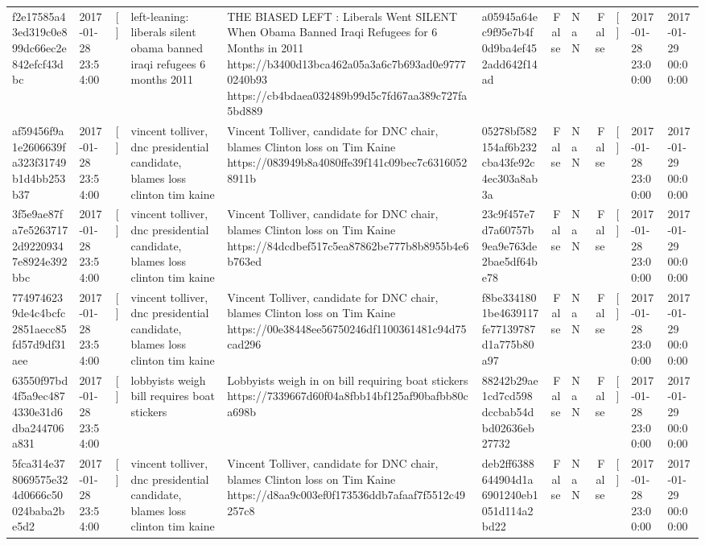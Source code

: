 \begin{tabular}{llllllrlrlll}
f2e17585a43ed319c0e899dc66ec2e842efcf43dbc & 2017-01-28 23:54:00 & [] & left-leaning: liberals silent obama banned iraqi refugees 6 months 2011 & THE BIASED LEFT : Liberals Went SILENT When Obama Banned Iraqi Refugees for 6 Months in 2011 https://b3400d13bca462a05a3a6c7b693ad0e97770240b93 https://cb4bdaea032489b99d5c7fd67aa389c727fa5bd889 & a05945a64ec9f95e7b4f0d9ba4ef452add642f14ad & False & NaN & False & [] & 2017-01-28 23:00:00 & 2017-01-29 00:00:00 \\
af59456f9a1e2606639fa323f31749b1d4bb253b37 & 2017-01-28 23:54:00 & [] & vincent tolliver, dnc presidential candidate, blames loss clinton tim kaine & Vincent Tolliver, candidate for DNC chair, blames Clinton loss on Tim Kaine https://083949b8a4080ffe39f141c09bec7c63160528911b & 05278bf582154af6b232cba43fe92c4ec303a8ab3a & False & NaN & False & [] & 2017-01-28 23:00:00 & 2017-01-29 00:00:00 \\
3f5e9ae87fa7e52637172d92209347e8924e392bbc & 2017-01-28 23:54:00 & [] & vincent tolliver, dnc presidential candidate, blames loss clinton tim kaine & Vincent Tolliver, candidate for DNC chair, blames Clinton loss on Tim Kaine https://84dcdbef517c5ea87862be777b8b8955b4e6b763ed & 23c9f457e7d7a60757b9ea9e763de2bae5df64be78 & False & NaN & False & [] & 2017-01-28 23:00:00 & 2017-01-29 00:00:00 \\
7749746239de4c4bcfc2851aecc85fd57d9df31aee & 2017-01-28 23:54:00 & [] & vincent tolliver, dnc presidential candidate, blames loss clinton tim kaine & Vincent Tolliver, candidate for DNC chair, blames Clinton loss on Tim Kaine https://00e38448ee56750246df1100361481c94d75cad296 & f8be3341801be4639117fe77139787d1a775b80a97 & False & NaN & False & [] & 2017-01-28 23:00:00 & 2017-01-29 00:00:00 \\
63550f97bd4f5a9ec4874330e31d6dba244706a831 & 2017-01-28 23:54:00 & [] & lobbyists weigh bill requires boat stickers & Lobbyists weigh in on bill requiring boat stickers https://7339667d60f04a8fbb14bf125af90bafbb80ca698b & 88242b29ae1cd7cd598dccbab54dbd02636eb27732 & False & NaN & False & [] & 2017-01-28 23:00:00 & 2017-01-29 00:00:00 \\
5fca314e378069575e324d0666c50024baba2be5d2 & 2017-01-28 23:54:00 & [] & vincent tolliver, dnc presidential candidate, blames loss clinton tim kaine & Vincent Tolliver, candidate for DNC chair, blames Clinton loss on Tim Kaine https://d8aa9c003ef0f173536ddb7afaaf7f5512c49257c8 & deb2ff6388644904d1a6901240eb1051d114a2bd22 & False & NaN & False & [] & 2017-01-28 23:00:00 & 2017-01-29 00:00:00 \\

\end{tabular}
